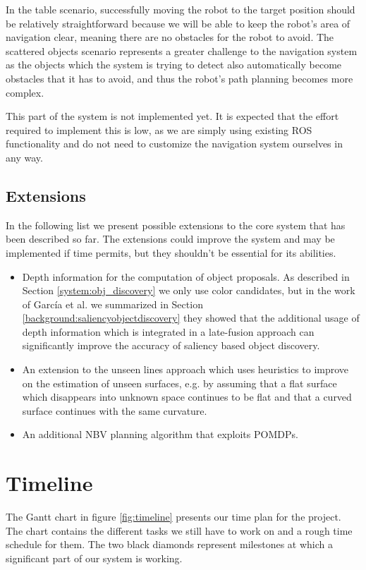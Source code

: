 \documentclass[a4paper,11pt,english]{article}
\begin{document}
In the table scenario, successfully moving the robot to the target position should be relatively straightforward because we will be able to keep the robot's area of navigation clear, meaning there are no obstacles for the robot to avoid.
The scattered objects scenario represents a greater challenge to the navigation system as the objects which the system is trying to detect also automatically become obstacles that it has to avoid, and thus the robot's path planning becomes more complex.

This part of the system is not implemented yet. It is expected that the effort required to implement this is low, as we are simply using existing ROS functionality and do not need to customize the navigation system ourselves in any way.

\subsection{Extensions}
\label{system:extensions}
In the following list we present possible extensions to the core system that has been described so far. 
The extensions could improve the system and may be implemented if time permits, but they shouldn't be essential for its abilities.

\begin{itemize}
	\item Depth information for the computation of object proposals.
	As described in Section \ref{system:obj_discovery} we only use color candidates, but in the work of García et al. we summarized in Section \ref{background:saliencyobjectdiscovery} they showed that the additional usage of depth information which is integrated in a late-fusion approach can significantly improve the accuracy of saliency based object discovery.
	\item An extension to the unseen lines approach which uses heuristics to improve on the estimation of unseen surfaces, e.g. by assuming that a flat surface which disappears into unknown space continues to be flat and that a curved surface continues with the same curvature.
	\item An additional NBV planning algorithm that exploits POMDPs.
\end{itemize}

\section{Timeline}
\label{timeline}

The Gantt chart in figure \ref{fig:timeline} presents our time plan for the project.
The chart contains the different tasks we still have to work on and a rough time schedule for them.
The two black diamonds represent milestones at which a significant part of our system is working.
\end{document}
